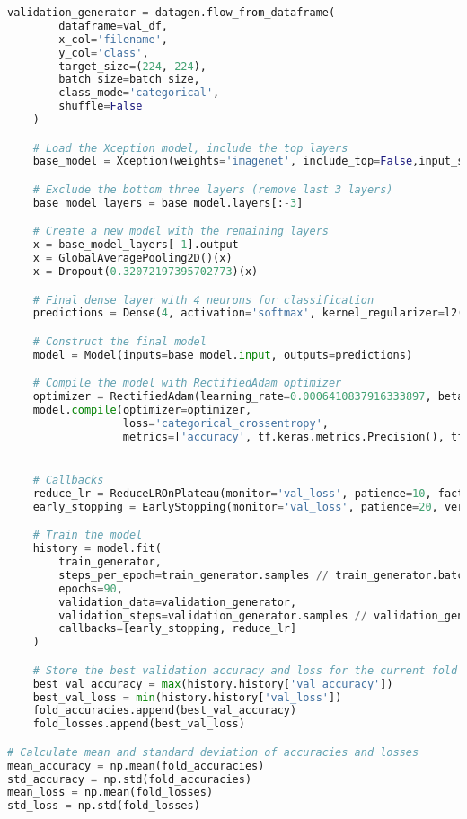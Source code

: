 \begin{lstlisting}[language=Python]
    validation_generator = datagen.flow_from_dataframe(
        dataframe=val_df,
        x_col='filename',
        y_col='class',
        target_size=(224, 224),
        batch_size=batch_size,
        class_mode='categorical',
        shuffle=False
    )

    # Load the Xception model, include the top layers
    base_model = Xception(weights='imagenet', include_top=False,input_shape=(224,224,3))

    # Exclude the bottom three layers (remove last 3 layers)
    base_model_layers = base_model.layers[:-3]

    # Create a new model with the remaining layers
    x = base_model_layers[-1].output
    x = GlobalAveragePooling2D()(x)
    x = Dropout(0.32072197395702773)(x)

    # Final dense layer with 4 neurons for classification
    predictions = Dense(4, activation='softmax', kernel_regularizer=l2(0.1), dtype='float64')(x)

    # Construct the final model
    model = Model(inputs=base_model.input, outputs=predictions)

    # Compile the model with RectifiedAdam optimizer
    optimizer = RectifiedAdam(learning_rate=0.0006410837916333897, beta_1=0.9, beta_2=0.999, epsilon=1e-08)
    model.compile(optimizer=optimizer,
                  loss='categorical_crossentropy',
                  metrics=['accuracy', tf.keras.metrics.Precision(), tf.keras.metrics.Recall(), 'categorical_accuracy'])


    # Callbacks
    reduce_lr = ReduceLROnPlateau(monitor='val_loss', patience=10, factor=0.3, min_lr=1e-6, verbose=1)
    early_stopping = EarlyStopping(monitor='val_loss', patience=20, verbose=1, mode='auto')

    # Train the model
    history = model.fit(
        train_generator,
        steps_per_epoch=train_generator.samples // train_generator.batch_size,
        epochs=90,
        validation_data=validation_generator,
        validation_steps=validation_generator.samples // validation_generator.batch_size,
        callbacks=[early_stopping, reduce_lr]
    )

    # Store the best validation accuracy and loss for the current fold
    best_val_accuracy = max(history.history['val_accuracy'])
    best_val_loss = min(history.history['val_loss'])
    fold_accuracies.append(best_val_accuracy)
    fold_losses.append(best_val_loss)

# Calculate mean and standard deviation of accuracies and losses
mean_accuracy = np.mean(fold_accuracies)
std_accuracy = np.std(fold_accuracies)
mean_loss = np.mean(fold_losses)
std_loss = np.std(fold_losses)


\end{lstlisting}
